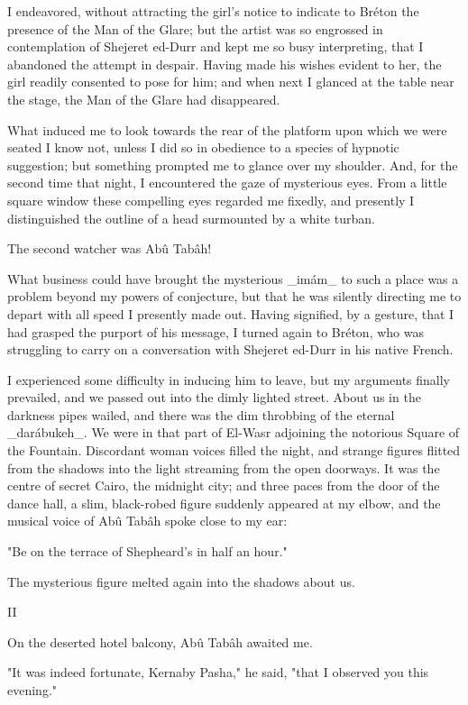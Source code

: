 I endeavored, without attracting the girl's notice to indicate to
Bréton the presence of the Man of the Glare; but the artist was so
engrossed in contemplation of Shejeret ed-Durr and kept me so busy
interpreting, that I abandoned the attempt in despair. Having made his
wishes evident to her, the girl readily consented to pose for him; and
when next I glanced at the table near the stage, the Man of the Glare
had disappeared.

What induced me to look towards the rear of the platform upon which
we were seated I know not, unless I did so in obedience to a species
of hypnotic suggestion; but something prompted me to glance over my
shoulder. And, for the second time that night, I encountered the gaze
of mysterious eyes. From a little square window these compelling eyes
regarded me fixedly, and presently I distinguished the outline of a
head surmounted by a white turban.

The second watcher was Abû Tabâh!

What business could have brought the mysterious _imám_ to such a place
was a problem beyond my powers of conjecture, but that he was silently
directing me to depart with all speed I presently made out. Having
signified, by a gesture, that I had grasped the purport of his
message, I turned again to Bréton, who was struggling to carry on a
conversation with Shejeret ed-Durr in his native French.

I experienced some difficulty in inducing him to leave, but my
arguments finally prevailed, and we passed out into the dimly lighted
street. About us in the darkness pipes wailed, and there was the dim
throbbing of the eternal _darábukeh_. We were in that part of El-Wasr
adjoining the notorious Square of the Fountain. Discordant woman
voices filled the night, and strange figures flitted from the shadows
into the light streaming from the open doorways. It was the centre of
secret Cairo, the midnight city; and three paces from the door of the
dance hall, a slim, black-robed figure suddenly appeared at my elbow,
and the musical voice of Abû Tabâh spoke close to my ear:

"Be on the terrace of Shepheard's in half an hour."

The mysterious figure melted again into the shadows about us.


II

On the deserted hotel balcony, Abû Tabâh awaited me.

"It was indeed fortunate, Kernaby Pasha," he said, "that I observed
you this evening."

